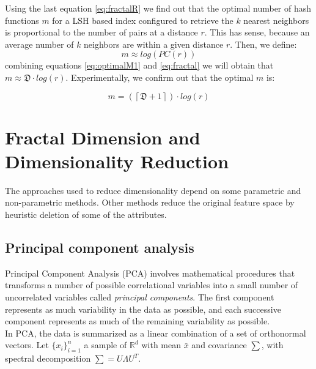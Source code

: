 \documentclass{article}
\begin{document}
 Using the last equation \ref{eq:fractalR} we find out that the optimal number of hash functions $m$  for a \acf{LSH} based index configured to retrieve the $k$ nearest neighbors is proportional to the number of pairs at a distance $r$. This has sense, because an average number of $k$ neighbors  are within a given distance $r$.  Then, we define:
\begin{equation}\label{eq:optimalM1}
   m \approx log (PC(r)) 
\end{equation}
 combining  equations \ref{eq:optimalM1} and \ref{eq:fractal} we will obtain that $m \approx \mathfrak{D} \cdot log (r)  $. Experimentally, we confirm out that the optimal  $m$ is:

 \begin{equation}\label{eq:fractalm}
    m = (\left\lceil \mathfrak{D} + 1 \right\rceil  ) \cdot  log (r)
 \end{equation}

 


\section{Fractal Dimension and Dimensionality Reduction}
The approaches used to reduce dimensionality depend on some parametric and non-parametric methods. Other methods reduce the original feature space by heuristic deletion of some of the attributes.

\subsection{Principal component analysis}
Principal Component Analysis (PCA) involves mathematical procedures that transforms a number of possible correlational variables into a small number of uncorrelated variables called \textit{principal components}. The first component represents as much variability in the data as possible, and each successive component represents as much of the remaining variability as possible. \\

In PCA, the data is summarized as a linear combination of a set of orthonormal vectors. Let $\{ x_i \}_{i=1}^n$  a sample of $ \mathbb{R}^d $  with mean $\bar{x}$  and covariance $ \sum $, with spectral decomposition $ \sum = U \Lambda U^T $.
\end{document}
